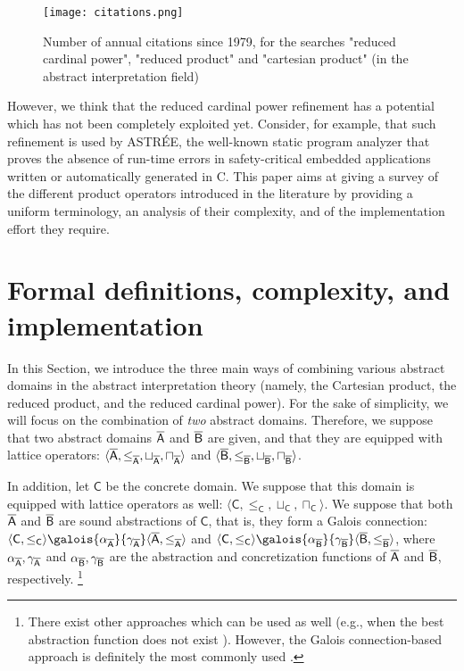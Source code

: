 \documentclass[submission,copyright,creativecommons]{eptcs}
\newcommand{\cset}[1]{\ensuremath{\mathsf{#1}}}
\newcommand{\firstdomain}{\aset{A}}
\newcommand{\seconddomain}{\aset{B}}
\newcommand{\concretedomain}{\cset{C}}
\begin{document}
\begin{center}
\begin{figure}
\texttt{[image: citations.png]}
\label{fig:citations}
\caption{Number of annual citations since 1979, for the searches "reduced cardinal power", "reduced product" and "cartesian product" (in the abstract interpretation field)}
\end{figure}
\end{center}

However, we think that the reduced cardinal power refinement has a potential which has not been completely exploited yet. Consider, for example, that such refinement is used by ASTR\'EE\cite{CCFMMMR05}, the well-known static program analyzer that proves the absence of run-time errors in safety-critical embedded applications written or automatically generated in C. This paper aims at giving a survey of the different product operators introduced in the literature by providing a uniform terminology, an analysis of their complexity, and of the implementation effort they require.


\section{Formal definitions, complexity, and implementation}
\label{sect:formaldef}
In this Section, we introduce the three main ways of combining various abstract domains in the abstract interpretation theory (namely, the Cartesian product, the reduced product, and the reduced cardinal power). For the sake of simplicity, we will focus on the combination of \emph{two} abstract domains. Therefore, we suppose that two abstract domains $\firstdomain$ and $\seconddomain$ are given, and that they are equipped with lattice operators: $\langle \firstdomain, \leq_\firstdomain, \sqcup_\firstdomain, \sqcap_\firstdomain \rangle$ and $\langle \seconddomain, \leq_\seconddomain, \sqcup_\seconddomain, \sqcap_\seconddomain \rangle$.

In addition, let $\concretedomain$ be the concrete domain. We suppose that this domain is equipped with lattice operators as well: $\langle \concretedomain, \leq_\concretedomain, \sqcup_\concretedomain, \sqcap_\concretedomain \rangle$. We suppose that both $\firstdomain$ and $\seconddomain$ are sound abstractions of $\concretedomain$, that is, they form a Galois connection: $\langle \concretedomain, \leq_\concretedomain \rangle \galois{\alpha_\firstdomain}{\gamma_\firstdomain} \langle \firstdomain, \leq_\firstdomain \rangle$ and $\langle \concretedomain, \leq_\concretedomain \rangle \galois{\alpha_\seconddomain}{\gamma_\seconddomain} \langle \seconddomain, \leq_\seconddomain \rangle$, where $\alpha_\firstdomain, \gamma_\firstdomain$ and $\alpha_\seconddomain, \gamma_\seconddomain$ are the abstraction and concretization functions of $\firstdomain$ and $\seconddomain$, respectively. \footnote{There exist other approaches which can be used as well (e.g., when the best abstraction function does not exist \cite{CH78}). However, the Galois connection-based approach is definitely the most commonly used \cite{CC92a}.}
\end{document}
